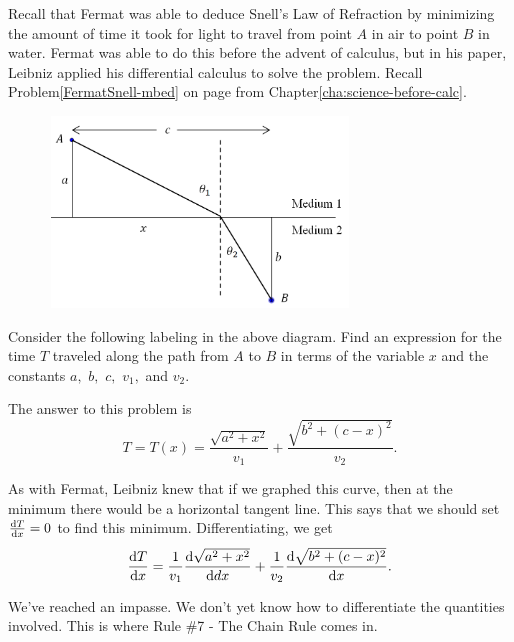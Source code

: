 Recall that Fermat was able to deduce Snell's Law of Refraction by
minimizing the amount of time it took for light to travel from point $A$
in air to point $B$ in water\pageref{FermatSnell}.  Fermat was able to do this before
the advent of calculus, but in his paper, Leibniz applied his
differential calculus to solve the problem.  Recall
Problem\ref{FermatSnell-mbed} on page\pageref{FermatSnell} from
Chapter\ref{cha:science-before-calc}.
\begin{embeddedproblem}{}
\centerline{\includegraphics*[height=2in,width=4in]{Figures/Refraction3}}
Consider the following labeling in the above diagram.
 Find an expression for the time $T$ traveled along the path from $A$
 to $B$ in terms of the variable $x$ and the constants $a,$ $b,$ $c,$ $v_1,$
 and $v_2.$

 The answer to this problem is
 $$
 T=T(x)=\frac{\sqrt{a^2+x^2}}{v_1} +\frac{\sqrt{b^2+(c-x)^2}}{v_2}. 
 $$

As with Fermat, Leibniz knew that if we graphed this curve, then at
the minimum there would be a horizontal tangent line.  This says that
we should set $\frac{\text{d}{T}}{\text{d}{x}}=0$ to find this minimum.  Differentiating, we get
$$
\frac{\text{d}{T}}{\text{d}{x}}=\frac{1}{v_1}   \frac{\text{d}{\sqrt{a^2+x^2}}}{\text{d}{dx}}+\frac{1}{v_2}
\frac{\text{d}{\sqrt{b^2+(c-x)^2}}}{\text{d}{x}}.
$$

We've reached an impasse.  We don't yet know how to differentiate the
quantities involved.  This is where Rule \#7 - The Chain Rule comes in.




\end{embeddedproblem}

